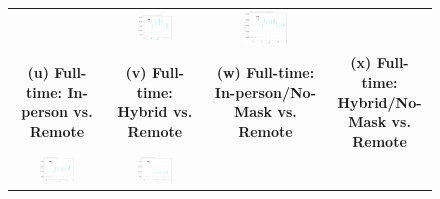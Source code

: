 \documentclass[9pt,twocolumn,twoside,lineno]{pnas-new}
\begin{document}
\begin{figure}[!ht]
{\begin{minipage}{\linewidth}
\begin{tabular}{cccc}
 &
 \includegraphics[width=0.4\textwidth]{event_school_csfullno.pdf}& \includegraphics[width=0.4\textwidth]{event_school_cshybridno.pdf}  \smallskip\\
 \textbf{\large (u) Full-time: In-person vs. Remote }&\textbf{\large (v) Full-time:  Hybrid vs. Remote }&\textbf{\large (w) Full-time: In-person/No-Mask vs. Remote}&\textbf{\large (x) Full-time:  Hybrid/No-Mask vs. Remote }\smallskip\\
 \includegraphics[width=0.4\textwidth]{event_fullwork_csfull.pdf}& \includegraphics[width=0.4\textwidth]{event_fullwork_cshybrid.pdf}
 &

\end{tabular}
\end{minipage}}
\end{figure}
\end{document}
